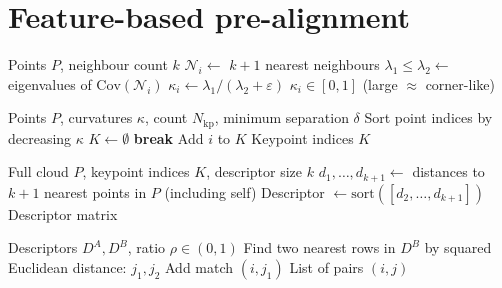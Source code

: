 \documentclass[11pt,a4paper]{article}
\begin{document}
\section{Feature-based pre-alignment}

\begin{algorithm}
\caption{Curvature proxy from local PCA (\texttt{compute\_curvature})}
\begin{algorithmic}[1]
\Require Points $P$, neighbour count $k$
    \State $\mathcal{N}_i \gets$ $k{+}1$ nearest neighbours
    \State $\lambda_1 \le \lambda_2 \gets$ eigenvalues of $\mathrm{Cov}(\mathcal{N}_i)$
    \State $\kappa_i \gets \lambda_1 / (\lambda_2 + \varepsilon)$
\EndFor
\Ensure $\kappa_i \in [0,1]$ (large $\approx$ corner-like)
\end{algorithmic}
\end{algorithm}

\begin{algorithm}
\caption{Keypoint extraction with spatial non-max suppression (\texttt{extract\_keypoints})}
\begin{algorithmic}[1]
\Require Points $P$, curvatures $\kappa$, count $N_{\mathrm{kp}}$, minimum separation $\delta$
\State Sort point indices by decreasing $\kappa$
\State $K \gets \emptyset$
     \textbf{break} \EndIf
        \State Add $i$ to $K$
    \EndIf
\EndFor
\Ensure Keypoint indices $K$
\end{algorithmic}
\end{algorithm}

\begin{algorithm}
\caption{Sorted-distance descriptor (\texttt{compute\_descriptors})}
\begin{algorithmic}[1]
\Require Full cloud $P$, keypoint indices $K$, descriptor size $k$
    \State $d_1,\ldots,d_{k+1} \gets$ distances to $k{+}1$ nearest points in $P$ (including self)
    \State Descriptor $\gets \mathrm{sort}([d_2,\ldots,d_{k+1}])$ 
\EndFor
\Ensure Descriptor matrix
\end{algorithmic}
\end{algorithm}

\begin{algorithm}
\caption{Descriptor matching with Lowe's ratio test (\texttt{match\_descriptors})}
\begin{algorithmic}[1]
\Require Descriptors $D^A, D^B$, ratio $\rho \in (0,1)$
    \State Find two nearest rows in $D^B$ by squared Euclidean distance: $j_1, j_2$
        \State Add match $(i, j_1)$
    \EndIf
\EndFor
\Ensure List of pairs $(i,j)$
\end{algorithmic}
\end{algorithm}
\end{document}
